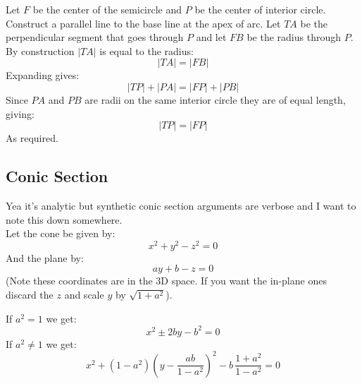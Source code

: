 Let $F$ be the center of the semicircle and $P$ be the center of interior circle.
Construct a parallel line to the base line at the apex of arc.
Let $TA$ be the perpendicular segment that goes through $P$ and let $FB$ be the radius through $P$.
\\

By construction $|TA|$ is equal to the radius:
\[|TA| = |FB|\]
Expanding gives:
\[|TP|+|PA| = |FP|+|PB|\]
Since $PA$ and $PB$ are radii on the same interior circle they are of equal length,
giving:
\[|TP| = |FP|\]
As required.

\subsection{Conic Section}
Yea it's analytic but synthetic conic section arguments are verbose and I want to note this down somewhere.
\\

Let the cone be given by:
\[x^2+y^2-z^2=0\]
And the plane by:
\[ay+b-z=0\]
(Note these coordinates are in the 3D space.
If you want the in-plane ones discard the $z$ and scale $y$ by $\sqrt{1+a^2}$).

If $a^2=1$ we get:
\[x^2\pm2by-b^2=0\]
If $a^2\neq 1$ we get:
\[x^2+(1-a^2)\left(y-\frac{ab}{1-a^2}\right)^2-b\,\frac{1+a^2}{1-a^2} = 0\]
%
%
%

%
%
%
